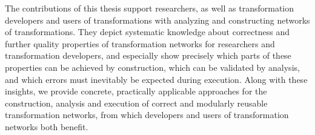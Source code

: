 The contributions of this thesis support researchers, as well as transformation developers and users of transformations with analyzing and constructing networks of transformations.
They depict systematic knowledge about correctness and further quality properties of transformation networks for researchers and transformation developers, and especially show precisely which parts of these properties can be achieved by construction, which can be validated by analysis, and which errors must inevitably be expected during execution. 
Along with these insights, we provide concrete, practically applicable approaches for the construction, analysis and execution of correct and modularly reusable transformation networks, from which developers and users of transformation networks both benefit.